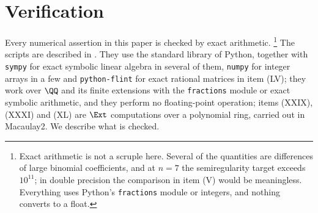 \enlargethispage{4pt}
\section{Verification}\label{sec:verification}

Every numerical assertion in this paper is checked by exact arithmetic.%
\footnote{Exact arithmetic is not a scruple here. Several of the quantities are differences of large binomial coefficients, and at $n=7$ the semiregularity target exceeds $10^{11}$; in double precision the comparison in item (V) would be meaningless. Everything uses Python's \texttt{fractions} module or integers, and nothing converts to a float.} The
scripts are described in . They use the standard library of
Python, together with \texttt{sympy} for exact symbolic linear algebra in
several of them, \texttt{numpy} for integer arrays in a few and
\texttt{python-flint} for exact rational matrices in item (LV); they work over $\QQ$ and
its finite extensions with the \texttt{fractions} module or exact symbolic
arithmetic, and they perform no floating-point operation; items (XXIX), (XXXI) and (XL) are $\Ext$
computations over a polynomial ring, carried out in Macaulay2. We describe what is checked.

